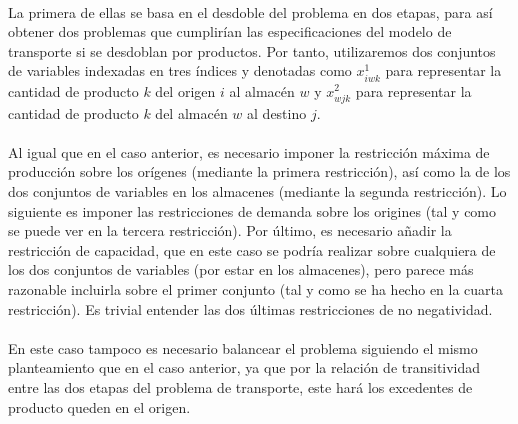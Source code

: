 \documentclass[a4paper, spanish]{article}
\begin{document}
    \paragraph{}
    La primera de ellas se basa en el desdoble del problema en dos etapas, para así obtener dos problemas que cumplirían las especificaciones del modelo de transporte si se desdoblan por productos. Por tanto, utilizaremos dos conjuntos de variables indexadas en tres índices y denotadas como $x^{1}_{iwk}$ para representar la cantidad de producto $k$ del origen $i$ al almacén $w$ y $x^{2}_{wjk}$ para representar la cantidad de producto $k$ del almacén $w$ al destino $j$.

    \paragraph{}
    Al igual que en el caso anterior, es necesario imponer la restricción máxima de producción sobre los orígenes (mediante la primera restricción), así como la  de los dos conjuntos de variables en los almacenes (mediante la segunda restricción). Lo siguiente es imponer las restricciones de demanda sobre los origines (tal y como se puede ver en la tercera restricción). Por último, es necesario añadir la restricción de capacidad, que en este caso se podría realizar sobre cualquiera de los dos conjuntos de variables (por estar en los almacenes), pero parece más razonable incluirla sobre el primer conjunto (tal y como se ha hecho en la cuarta restricción). Es trivial entender las dos últimas restricciones de no negatividad.

    \paragraph{}
    En este caso tampoco es necesario balancear el problema siguiendo el mismo planteamiento que en el caso anterior, ya que por la relación de transitividad entre las dos etapas del problema de transporte, este hará los excedentes de producto queden en el origen.
\end{document}
